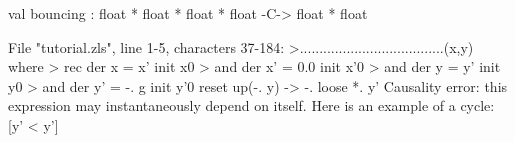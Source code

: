 \chklistingfalse
{}
\begin{ChkListingMsg}
val bouncing : float * float * float * float -C-> float * float 
\end{ChkListingMsg}
\begin{ChkListingErr}
File "tutorial.zls", line 1-5, characters 37-184:
>.....................................(x,y) where
> rec der x = x' init x0
> and der x' = 0.0 init x'0
> and der y = y' init y0
> and der y' = -. g init y'0 reset up(-. y) -> -. loose *. y'
Causality error: this expression may instantaneously depend on itself.
Here is an example of a cycle:
[y' < y']
\end{ChkListingErr}
